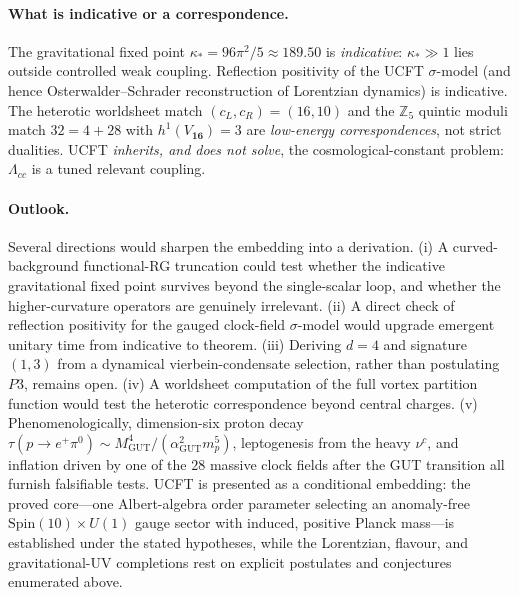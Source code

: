 \paragraph{What is indicative or a correspondence.}
The gravitational fixed point $\kappa_{\ast}=96\pi^{2}/5\approx189.50$ is
\emph{indicative}: $\kappa_{\ast}\gg1$ lies outside controlled weak
coupling. Reflection positivity of the UCFT $\sigma$-model (and hence
Osterwalder--Schrader reconstruction of Lorentzian dynamics) is
indicative. The heterotic worldsheet match $(c_{L},c_{R})=(16,10)$ and
the $\mathbb{Z}_{5}$ quintic moduli match $32=4+28$ with
$h^{1}(V_{\mathbf{16}})=3$ are \emph{low-energy correspondences}, not
strict dualities. UCFT \emph{inherits, and does not solve}, the
cosmological-constant problem: $\Lambda_{cc}$ is a tuned relevant
coupling.

\paragraph{Outlook.}
Several directions would sharpen the embedding into a derivation. (i) A
curved-background functional-RG truncation could test whether the
indicative gravitational fixed point survives beyond the single-scalar
loop, and whether the higher-curvature operators are genuinely
irrelevant. (ii) A direct check of reflection positivity for the gauged
clock-field $\sigma$-model would upgrade emergent unitary time from
indicative to theorem. (iii) Deriving $d=4$ and signature $(1,3)$ from a
dynamical vierbein-condensate selection, rather than postulating $P3$,
remains open. (iv) A worldsheet computation of the full
vortex partition function would test the heterotic correspondence beyond
central charges. (v) Phenomenologically, dimension-six proton decay
$\tau(p\to e^{+}\pi^{0})\sim M_{\mathrm{GUT}}^{4}/(\alpha_{\mathrm{GUT}}^{2}
m_{p}^{5})$, leptogenesis from the heavy $\nu^{c}$, and inflation driven
by one of the $28$ massive clock fields after the GUT transition all
furnish falsifiable tests. UCFT is presented as a conditional embedding:
the proved core---one Albert-algebra order parameter selecting an
anomaly-free $\mathrm{Spin}(10)\times U(1)$ gauge sector with induced,
positive Planck mass---is established under the stated hypotheses, while the
Lorentzian, flavour, and gravitational-UV completions rest on explicit
postulates and conjectures enumerated above.
